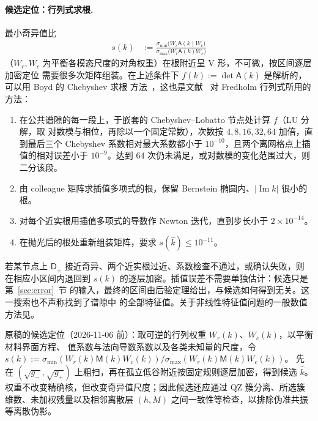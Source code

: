 \paragraph{候选定位：行列式求根.}
最小奇异值比
\begin{align}
  s(k)&:=\frac{\sigma_{\min}\bigl(W_r\mathsf A(k)W_c\bigr)}
             {\sigma_{\max}\bigl(W_r\mathsf A(k)W_c\bigr)}
  \label{eq:candidate-score}
\end{align}
（$W_r,W_c$ 为平衡各模态尺度的对角权重）在根附近呈 V 形，不可微，按区间逐层加密定位
需要很多次矩阵组装。在上述条件下 $f(k):=\det\mathsf A(k)$ 是解析的，可以用 Boyd 的 Chebyshev 求根
方法~\cite{Boyd2002}，这也是文献~\cite{ZhaoBarnett2015} 对 Fredholm 行列式所用的方法：
\begin{enumerate}
  \item 在公共谱隙的每一段上，于嵌套的 Chebyshev--Lobatto 节点处计算 $f$（LU 分解，取
    对数模与相位，再除以一个固定常数），次数按 $4,8,16,32,64$ 加倍，直到最后三个
    Chebyshev 系数相对最大系数都小于 $10^{-10}$，且两个离网格点上插值的相对误差小于
    $10^{-9}$。达到 $64$ 次仍未满足，或对数模的变化范围过大，则二分该段。
  \item 由 colleague 矩阵求插值多项式的根，保留 Bernstein 椭圆内、$|\operatorname{Im}k|$
    很小的根。
  \item 对每个近实根用插值多项式的导数作 Newton 迭代，直到步长小于 $2\times10^{-14}$。
  \item 在抛光后的根处重新组装矩阵，要求 $s(\widehat k)\leq10^{-11}$。
\end{enumerate}
若某节点上 $\mathsf D_\pm$ 接近奇异、两个近实根过近、系数检查不通过，或确认失败，则
在相应小区间内退回到 $s(k)$ 的逐层加密。插值误差不需要单独估计：候选只是第~\ref{sec:error}~节
的输入，最终的区间由后验定理给出，与候选如何得到无关。这一搜索也不声称找到了谱隙中
的全部特征值。关于非线性特征值问题的一般数值方法见\cite{GuettelTisseur2017}。

\begin{workonly}
原稿的候选定位（2026-11-06 前）：取可逆的行列权重 $W_r(k)$、$W_c(k)$，以平衡材料界面方程、
值系数与法向导数系数以及各类未知量的尺度，令
$s(k):=\sigma_{\min}(W_r(k)\mathsf M(k)W_c(k))/\sigma_{\max}(W_r(k)\mathsf M(k)W_c(k))$。
先在 $(\sqrt{g_-},\sqrt{g_+})$ 上粗扫，再在孤立低谷附近按固定规则逐层加密，得到候选
$\widehat k$。权重不改变精确核，但改变奇异值尺度；因此候选还应通过 QZ 簇分离、所选簇
维数、未加权残量以及相邻离散层 $(h,M)$ 之间一致性等检查，以排除伪准共振等离散伪影。
\end{workonly}

